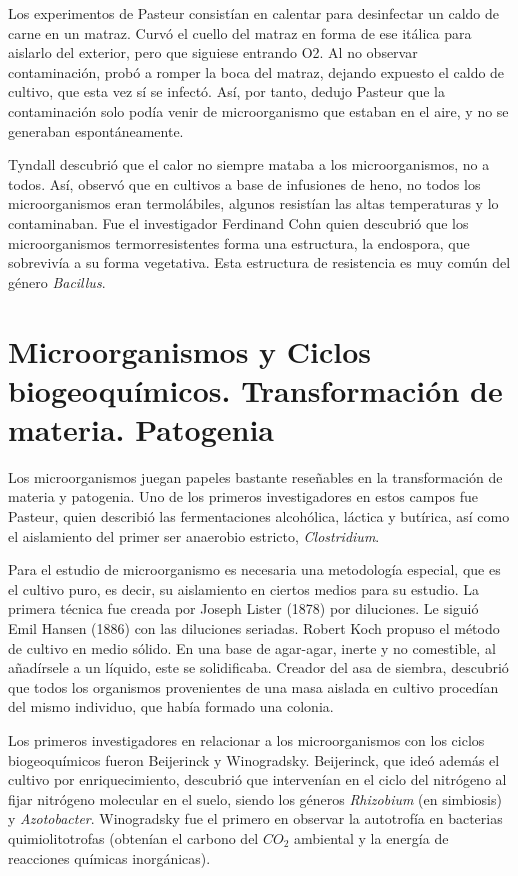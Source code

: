 Los experimentos de Pasteur consistían en calentar para desinfectar un caldo de carne en un matraz. Curvó el cuello del matraz en forma de ese itálica para aislarlo del exterior, pero que siguiese entrando O2. Al no observar contaminación, probó a romper la boca del matraz, dejando expuesto el caldo de cultivo, que esta vez sí se infectó. Así, por tanto, dedujo Pasteur que la contaminación solo podía venir de microorganismo que estaban en el aire, y no se generaban espontáneamente.

Tyndall descubrió que el calor no siempre mataba a los microorganismos, no a todos. Así, observó que en cultivos a base de infusiones de heno, no todos los microorganismos eran termolábiles, algunos resistían las altas temperaturas y lo contaminaban. Fue el investigador Ferdinand Cohn quien descubrió que los microorganismos termorresistentes forma una estructura, la endospora, que sobrevivía a su forma vegetativa. Esta estructura de resistencia es muy común del género \textit{Bacillus}.
\section{Microorganismos y Ciclos biogeoquímicos. Transformación de materia. Patogenia}
\label{chap1:sec:totumrevolutum}
Los microorganismos juegan papeles bastante reseñables en la transformación de materia y patogenia. Uno de los primeros investigadores en estos campos fue Pasteur, quien describió las fermentaciones alcohólica, láctica y butírica, así como el aislamiento del primer ser anaerobio estricto, \textit{Clostridium}.

Para el estudio de microorganismo es necesaria una metodología especial, que es el cultivo puro, es decir, su aislamiento en ciertos medios para su estudio. La primera técnica fue creada por Joseph Lister (1878) por diluciones. Le siguió Emil Hansen (1886) con las diluciones seriadas. Robert Koch propuso el método de cultivo en medio sólido. En una base de agar-agar, inerte y no comestible, al añadírsele a un líquido, este se solidificaba. Creador del asa de siembra, descubrió que todos los organismos provenientes de una masa aislada en cultivo procedían del mismo individuo, que había formado una colonia.

Los primeros investigadores en relacionar a los microorganismos con los ciclos biogeoquímicos fueron Beijerinck y Winogradsky. Beijerinck, que ideó además el cultivo por enriquecimiento, descubrió que intervenían en el ciclo del nitrógeno al fijar nitrógeno molecular en el suelo, siendo los géneros \textit{Rhizobium} (en simbiosis) y \textit{Azotobacter}. Winogradsky fue el primero en observar la autotrofía en bacterias quimiolitotrofas (obtenían el carbono del $CO_2$ ambiental y la energía de reacciones químicas inorgánicas).

